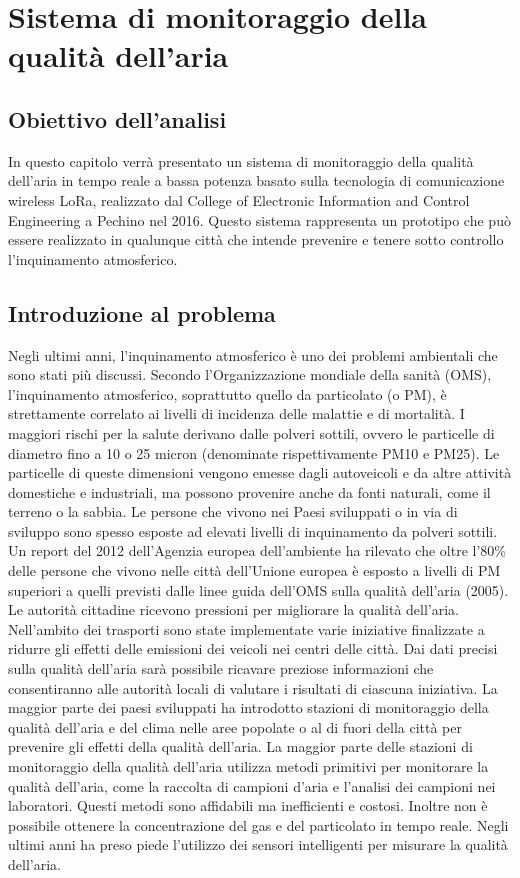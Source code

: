 \documentclass[a4paper]{report} %
\begin{document}
\chapter{Sistema di monitoraggio della qualità dell'aria}

\section{Obiettivo dell'analisi}
In questo capitolo verrà presentato un sistema di monitoraggio della qualità dell'aria in tempo reale a bassa potenza basato sulla tecnologia di comunicazione wireless LoRa, realizzato dal College of Electronic Information and Control Engineering a Pechino nel 2016. Questo sistema rappresenta un prototipo che può essere realizzato in qualunque città che intende prevenire e tenere sotto controllo l'inquinamento atmosferico.

\section{Introduzione al problema}
Negli ultimi anni, l'inquinamento atmosferico è uno dei problemi ambientali che sono stati più discussi. Secondo l'Organizzazione mondiale della sanità (OMS), l'inquinamento atmosferico, soprattutto quello da particolato (o PM), è strettamente correlato ai livelli di incidenza delle malattie e di mortalità. I maggiori rischi per la salute derivano dalle polveri sottili, ovvero le particelle di diametro fino a 10 o 25 micron (denominate rispettivamente PM10 e PM25). Le particelle di queste dimensioni vengono emesse dagli autoveicoli e da altre attività domestiche e industriali, ma possono provenire anche da fonti naturali, come il terreno o la sabbia. Le persone che vivono nei Paesi sviluppati o in via di sviluppo sono spesso esposte ad elevati livelli di inquinamento da polveri sottili. Un report del 2012 dell'Agenzia europea dell'ambiente ha rilevato che oltre l'80\% delle persone che vivono nelle città dell'Unione europea è esposto a livelli di PM superiori a quelli previsti dalle linee guida dell'OMS sulla qualità dell'aria (2005). Le autorità cittadine ricevono pressioni per migliorare la qualità dell'aria. Nell'ambito dei trasporti sono state implementate varie iniziative finalizzate a ridurre gli effetti delle emissioni dei veicoli nei centri delle città. Dai dati precisi sulla qualità dell'aria sarà possibile ricavare preziose informazioni che consentiranno alle autorità locali di valutare i risultati di ciascuna iniziativa. La maggior parte dei paesi sviluppati ha introdotto stazioni di monitoraggio della qualità dell'aria e del clima nelle aree popolate o al di fuori della città per prevenire gli effetti della qualità dell'aria. La maggior parte delle stazioni di monitoraggio della qualità dell'aria utilizza metodi primitivi per monitorare la qualità dell'aria, come la raccolta di campioni d'aria e l'analisi dei campioni nei laboratori. Questi metodi sono affidabili ma inefficienti e costosi. Inoltre non è possibile ottenere la concentrazione del gas e del particolato in tempo reale. Negli ultimi anni ha preso piede l'utilizzo dei sensori intelligenti per misurare la qualità dell'aria.
\end{document}
